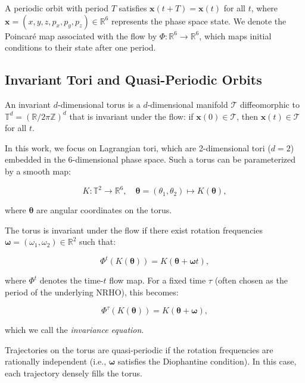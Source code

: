 \documentclass[review,onefignum,onetabnum]{siamart220329}
\newcommand{\RR}{\mathbb{R}}
\begin{document}
A periodic orbit with period $T$ satisfies $\mathbf{x}(t+T) = \mathbf{x}(t)$ for
all $t$, where $\mathbf{x} = (x,y,z,p_x,p_y,p_z) \in \RR^6$ represents the phase
space state. We denote the Poincaré map associated with the flow by
$\Phi: \RR^6 \to \RR^6$, which maps initial conditions to their state after one
period.

\subsection{Invariant Tori and Quasi-Periodic Orbits}

An invariant $d$-dimensional torus is a $d$-dimensional manifold $\mathcal{T}$
diffeomorphic to $\mathbb{T}^d = (\RR/2\pi\mathbb{Z})^d$ that is invariant under
the flow: if $\mathbf{x}(0) \in \mathcal{T}$, then $\mathbf{x}(t) \in \mathcal{T}$
for all $t$.

In this work, we focus on Lagrangian tori, which are 2-dimensional tori
($d=2$) embedded in the 6-dimensional phase space. Such a torus can be parameterized
by a smooth map:

\begin{equation}
K: \mathbb{T}^2 \to \RR^6, \quad \boldsymbol{\theta} = (\theta_1, \theta_2)
   \mapsto K(\boldsymbol{\theta}),
\end{equation}

where $\boldsymbol{\theta}$ are angular coordinates on the torus.

The torus is invariant under the flow if there exist rotation frequencies
$\boldsymbol{\omega} = (\omega_1, \omega_2) \in \RR^2$ such that:

\begin{equation}
\label{eq:invariance}
\Phi^t(K(\boldsymbol{\theta})) = K(\boldsymbol{\theta} + \boldsymbol{\omega} t),
\end{equation}

where $\Phi^t$ denotes the time-$t$ flow map. For a fixed time $\tau$ (often chosen
as the period of the underlying NRHO), this becomes:

\begin{equation}
\label{eq:invariance_discrete}
\Phi^\tau(K(\boldsymbol{\theta})) = K(\boldsymbol{\theta} + \boldsymbol{\omega}),
\end{equation}

which we call the \emph{invariance equation}.

Trajectories on the torus are quasi-periodic if the rotation frequencies are
rationally independent (i.e., $\boldsymbol{\omega}$ satisfies the Diophantine
condition). In this case, each trajectory densely fills the torus.
\end{document}
